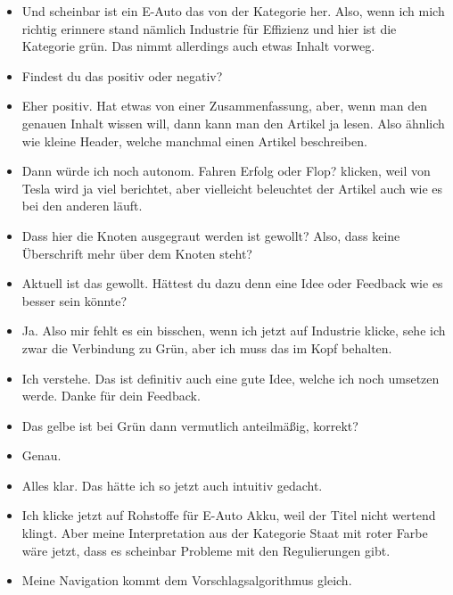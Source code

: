 {\begin{itemize}[]
                  Also speziell im Vergleich zu einem Verbrenner.
            \item {} Und scheinbar ist ein E-Auto das von der Kategorie her.
                  Also, wenn ich mich richtig erinnere stand nämlich Industrie für Effizienz und hier ist die Kategorie grün.
                  Das nimmt allerdings auch etwas Inhalt vorweg.
            \item {} Findest du das positiv oder negativ?
            \item {} Eher positiv.
                  Hat etwas von einer Zusammenfassung, aber, wenn man den genauen Inhalt wissen will, dann kann man den Artikel ja lesen.
                  Also ähnlich wie kleine Header, welche manchmal einen Artikel beschreiben.
            \item {} Dann würde ich noch \flqq autonom. Fahren Erfolg oder Flop?\frqq{} klicken, weil von Tesla wird ja viel berichtet, aber vielleicht beleuchtet der Artikel auch wie es bei den anderen läuft.
            \item {} Dass hier die Knoten ausgegraut werden ist gewollt?
                  Also, dass keine Überschrift mehr über dem Knoten steht?
            \item {} Aktuell ist das gewollt. Hättest du dazu denn eine Idee oder Feedback wie es besser sein könnte?
            \item {} Ja. Also mir fehlt es ein bisschen, wenn ich jetzt auf Industrie klicke, sehe ich zwar die Verbindung zu Grün, aber ich muss das im Kopf behalten.
            \item {} Ich verstehe. Das ist definitiv auch eine gute Idee, welche ich noch umsetzen werde. Danke für dein Feedback.
            \item {} Das gelbe ist bei Grün dann vermutlich anteilmäßig, korrekt?
            \item {} Genau.
            \item {} Alles klar. Das hätte ich so jetzt auch intuitiv gedacht.
            \item {} Ich klicke jetzt auf \flqq Rohstoffe für E-Auto Akku\frqq{}, weil der Titel nicht wertend klingt.
                  Aber meine Interpretation aus der Kategorie Staat mit roter Farbe wäre jetzt, dass es scheinbar Probleme mit den Regulierungen gibt.
            \item {} Meine Navigation kommt dem Vorschlagsalgorithmus gleich.

\end{itemize}}
